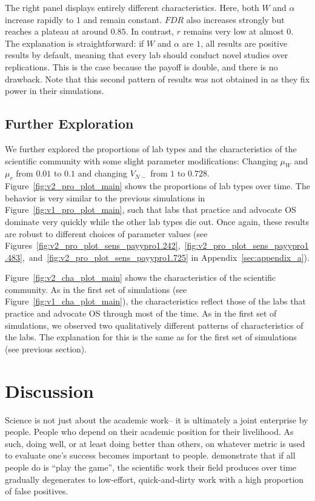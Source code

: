 \documentclass[meta, authordate,issue]{jote-new-article}
\begin{document}
The right panel displays entirely different characteristics. Here, both $W$ and $\alpha$ increase rapidly to $1$ and remain constant. $FDR$ also increases strongly but reaches a plateau at around $0.85$. In contrast, $r$ remains very low at almost $0$. The explanation is straightforward: if $W$ and $\alpha$ are $1$, all results are positive results by default, meaning that every lab should conduct novel studies over replications. This is the case because the payoff is double, and there is no drawback. Note that this second pattern of results was not obtained in \textcite{KohrtSmaldinoMcelreath_2022preprint} as they fix power in their simulations.



\subsection{Further Exploration}

We further explored the proportions of lab types and the characteristics of the scientific community with some slight parameter modifications: Changing $\mu_W$ and $\mu_r$ from $0.01$ to $0.1$ and changing $V_{N-}$ from $1$ to $0.728$. Figure~\ref{fig:v2_pro_plot_main} shows the proportions of lab types over time. The behavior is very similar to the previous simulations in Figure~\ref{fig:v1_pro_plot_main}, such that labs that practice and advocate OS dominate very quickly while the other lab types die out. Once again, these results are robust to different choices of parameter values (see Figures~\ref{fig:v2_pro_plot_sens_payypro1.242},~\ref{fig:v2_pro_plot_sens_payypro1.483},~and~\ref{fig:v2_pro_plot_sens_payypro1.725} in Appendix~\ref{sec:appendix_a}).

Figure~\ref{fig:v2_cha_plot_main} shows the characteristics of the scientific community. As in the first set of simulations (see Figure~\ref{fig:v1_cha_plot_main}), the characteristics reflect those of the labs that practice and advocate OS through most of the time. As in the first set of simulations, we observed two qualitatively different patterns of characteristics of the labs. The explanation for this is the same as for the first set of simulations (see previous section).
%
%
%
%

\section{Discussion}

Science is not just about the academic work-- it is ultimately a joint enterprise by people. People who depend on their academic position for their livelihood. As such, doing well, or at least doing better than others, on whatever metric is used to evaluate one's success becomes important to people. \textcite{SmaldinoMcelreath2016} demonstrate that if all people do is ``play the game'', the scientific work their field produces over time gradually degenerates to low-effort, quick-and-dirty work with a high proportion of false positives.
\end{document}
